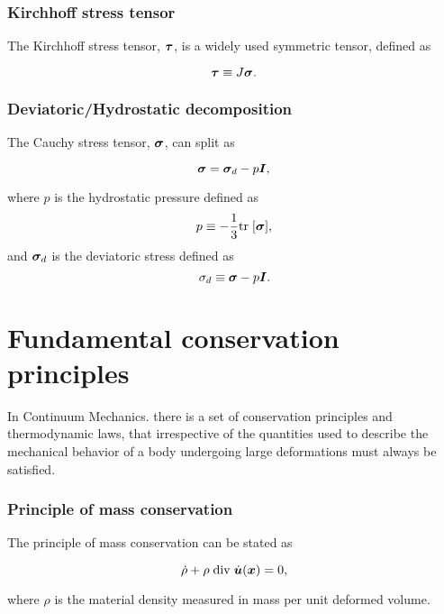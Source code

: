 \subsubsection{Kirchhoff stress tensor}

The Kirchhoff stress tensor, $\bm{\tau}$, is a widely used symmetric tensor, defined as
\begin{highlight}
    \begin{equation}
        \bm{\tau} \equiv J\bm{\sigma}.
    \end{equation}
\end{highlight}

\subsubsection{Deviatoric/Hydrostatic decomposition}

The Cauchy stress tensor, $\bm{\sigma}$, can split as
\begin{highlight}
    \begin{equation}
        \bm{\sigma} = \bm{\sigma}_d - p\bm{I},
    \end{equation}
\end{highlight}
where $p$ is the hydrostatic pressure defined as
\begin{equation}
    p \equiv -\frac{1}{3}\text{tr}\;[\bm{\sigma}],
\end{equation}
and $\bm{\sigma}_d$ is the deviatoric stress defined as
\begin{equation}
    \sigma_d \equiv \bm{\sigma} - p\bm{I}.
\end{equation}

\section{Fundamental conservation principles}

In Continuum Mechanics. there is a set of conservation principles and thermodynamic laws, that irrespective of the quantities used to describe the mechanical behavior of a body undergoing large deformations must always be satisfied.

\subsubsection{Principle of mass conservation}

The principle of mass conservation can be stated as
\begin{highlight}
    \begin{equation}
        \dot \rho + \rho\; \text{div}\; \dot{\bm{u}}(\bm{x})=0,
    \end{equation}
\end{highlight}
    where $\rho$ is the material density measured in mass per unit deformed volume.

